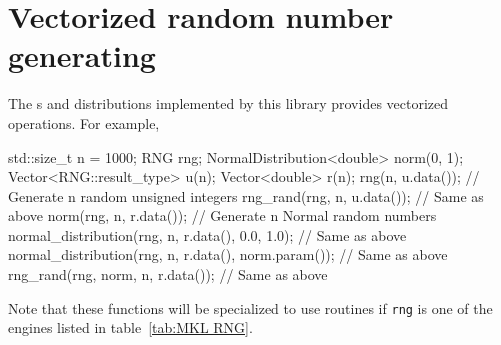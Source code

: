 \section{Vectorized random number generating}
\label{sec:Vectorized random number generating}

The \rng{}s and distributions implemented by this library provides vectorized
operations. For example,
\begin{cppcode}
  std::size_t n = 1000;
  RNG rng;
  NormalDistribution<double> norm(0, 1);
  Vector<RNG::result_type> u(n);
  Vector<double> r(n);
  rng(n, u.data());           // Generate n random unsigned integers
  rng_rand(rng, n, u.data()); // Same as above
  norm(rng, n, r.data());     // Generate n Normal random numbers
  normal_distribution(rng, n, r.data(), 0.0, 1.0);     // Same as above
  normal_distribution(rng, n, r.data(), norm.param()); // Same as above
  rng_rand(rng, norm, n, r.data());                    // Same as above
\end{cppcode}
Note that these functions will be specialized to use \mkl routines if
\verb|rng| is one of the engines listed in table~\ref{tab:MKL RNG}.
